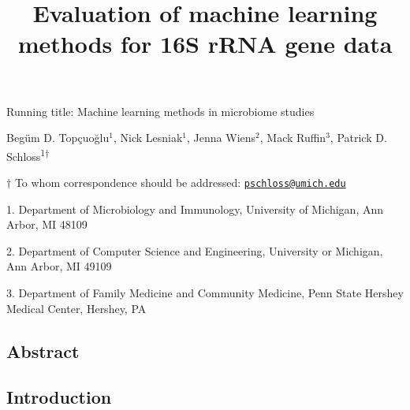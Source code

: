 \documentclass[11pt,]{article}
\title{\textbf{Evaluation of machine learning methods for 16S rRNA gene data}}
\author{}
\date{}
\begin{document}
\maketitle

\vspace{35mm}

Running title: Machine learning methods in microbiome studies

\vspace{35mm}

Begüm D. Topçuoğlu\({^1}\), Nick Lesniak\({^1}\), Jenna Wiens\({^2}\),
Mack Ruffin\({^3}\), Patrick D. Schloss\textsuperscript{1\(\dagger\)}

\vspace{40mm}

\(\dagger\) To whom correspondence should be addressed:
\href{mailto:pschloss@umich.edu}{\nolinkurl{pschloss@umich.edu}}

1. Department of Microbiology and Immunology, University of Michigan,
Ann Arbor, MI 48109

2. Department of Computer Science and Engineering, University or
Michigan, Ann Arbor, MI 49109

3. Department of Family Medicine and Community Medicine, Penn State
Hershey Medical Center, Hershey, PA

\newpage

\linenumbers

\subsection{Abstract}\label{abstract}

\newpage

\subsection{Introduction}\label{introduction}
\end{document}
